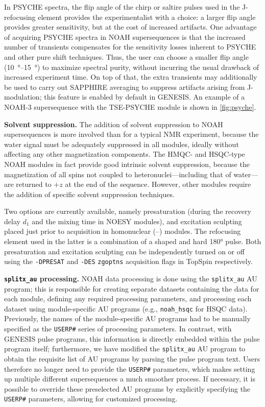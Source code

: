 \documentclass[a4paper,11pt]{article}
\newcommand{\proton}{\ch{^{1}H}}
\newcommand{\carbon}{\ch{^{13}C}}
\newcommand{\HH}{\proton{}--\proton{}}
\begin{document}
\begin{refsection}
In PSYCHE spectra, the flip angle of the chirp or saltire pulses used in the J-refocusing element provides the experimentalist with a choice: a larger flip angle provides greater sensitivity, but at the cost of increased artifacts.\autocite{Foroozandeh2018CEJ}
One advantage of acquiring PSYCHE spectra in NOAH supersequences is that the increased number of transients compensates for the sensitivity losses inherent to PSYCHE and other pure shift techniques.
Thus, the user can choose a smaller flip angle (\qtyrange{10}{15}{\degree}) to maximize spectral purity, without incurring the usual drawback of increased experiment time.
On top of that, the extra transients may additionally be used to carry out SAPPHIRE averaging to suppress artifacts arising from J-modulation;\autocite{Moutzouri2017CC} this feature is enabled by default in GENESIS.
An example of a NOAH-3 supersequence with the TSE-PSYCHE module is shown in \cref{fig:psyche}.

\textbf{Solvent suppression.} The addition of solvent suppression to NOAH supersequences is more involved than for a typical NMR experiment, because the water signal must be adequately suppressed in all modules, ideally without affecting any other magnetization components.
The HMQC- and HSQC-type NOAH modules in fact provide good intrinsic solvent suppression, because the magnetization of all \proton{} spins not coupled to heteronuclei---including that of water---are returned to \(+z\) at the end of the sequence.
However, other modules require the addition of specific solvent suppression techniques.

Two options are currently available, namely presaturation (during the recovery delay \(d_1\) and the mixing time in NOESY modules), and excitation sculpting placed just prior to acquisition in homonuclear (\HH{}) modules\autocite{Hwang1995JMR}.
The refocusing element used in the latter is a combination of a shaped and hard \ang{180} pulse.
Both presaturation and excitation sculpting can be independently turned on or off using the \texttt{-DPRESAT} and \texttt{-DES} \texttt{zgoptns} acquisition flags in TopSpin respectively.

\textbf{\texttt{splitx\_au} processing.} NOAH data processing is done using the \texttt{splitx\_au} AU program; this is responsible for creating separate datasets containing the data for each module, defining any required processing parameters, and processing each dataset using module-specific AU programs (e.g., \texttt{noah\_hsqc} for \carbon{} HSQC data).
Previously, the names of the module-specific AU programs had to be manually specified as the \texttt{USERP\#} series of processing parameters.
In contrast, with GENESIS pulse programs, this information is directly embedded within the pulse program itself; furthermore, we have modified the \texttt{splitx\_au} AU program to obtain the requisite list of AU programs by parsing the pulse program text.
Users therefore no longer need to provide the \texttt{USERP\#} parameters, which makes setting up multiple different supersequences a much smoother process.
If necessary, it is possible to override these preselected AU programs by explicitly specifying the \texttt{USERP\#} parameters, allowing for customized processing.


\end{refsection}
\end{document}
